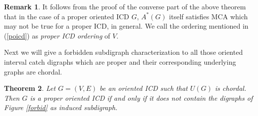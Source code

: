 \documentclass{article}
\newtheorem{thm}{Theorem}[section]
\theoremstyle{definition}
\newtheorem{rem}[thm]{Remark}
\numberwithin{equation}{section}
\begin{document}
\begin{rem}
It follows from the proof of the converse part of the above theorem that in the case of a proper oriented ICD $G$, $A^*(G)$ itself satisfies MCA which may not be true for a proper ICD, in general.
We call the ordering mentioned in (\ref{poicd}) as {\em proper ICD ordering} of $V$. 
\end{rem}


\noindent Next we will give a forbidden subdigraph characterization to all those oriented interval catch digraphs which are proper and their corresponding underlying graphs are chordal.  

\begin{thm}
Let $G=(V,E)$ be an oriented ICD such that $U(G)$ is chordal. Then $G$ is a proper oriented ICD if and only if it does not contain the digraphs of Figure \ref{forbid} as induced subdigraph.
\end{thm}
\end{document}
